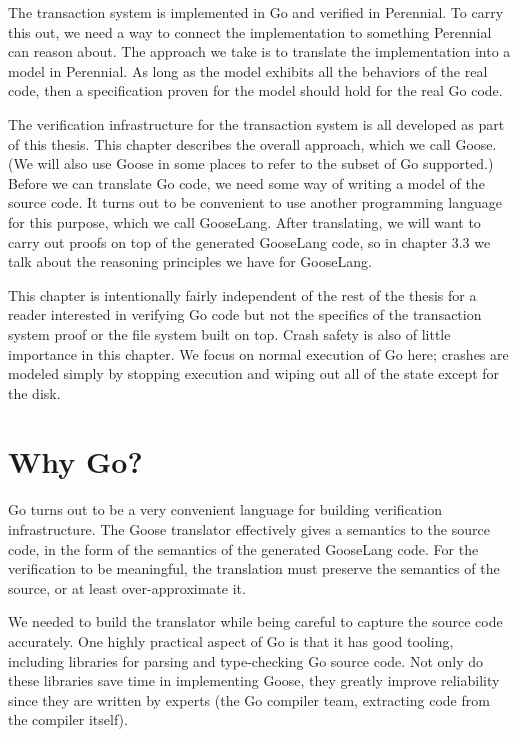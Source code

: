 The transaction system is implemented in Go and verified in Perennial.
To carry this out, we need a way to connect the implementation to
something Perennial can reason about. The approach we take is to
translate the implementation into a model in Perennial. As long as the
model exhibits all the behaviors of the real code, then a specification
proven for the model should hold for the real Go code.

The verification infrastructure for the transaction system is all
developed as part of this thesis. This chapter describes the overall
approach, which we call Goose. (We will also use Goose in some places to
refer to the subset of Go supported.) Before we can translate Go code, we need
some way of writing a model of the source code. It turns out to be
convenient to use another programming language for this purpose, which
we call GooseLang. After translating, we will want to carry out proofs
on top of the generated GooseLang code, so in chapter 3.3 we talk about
the reasoning principles we have for GooseLang.

This chapter is intentionally fairly independent of the rest of the
thesis for a reader interested in verifying Go code but not the
specifics of the transaction system proof or the file system built on
top. Crash safety is also of little importance in this chapter. We focus
on normal execution of Go here; crashes are modeled simply by stopping
execution and wiping out all of the state except for the disk.

\section{Why Go?}

Go turns out to be a very convenient language for building verification
infrastructure. The Goose translator effectively gives a semantics to
the source code, in the form of the semantics of the generated GooseLang
code. For the verification to be meaningful, the translation must
preserve the semantics of the source, or at least over-approximate it.

We needed to build the translator while being careful to capture the
source code accurately. One highly practical aspect of Go is that it has
good tooling, including libraries for parsing and type-checking Go
source code. Not only do these libraries save time in implementing
Goose, they greatly improve reliability since they are written by
experts (the Go compiler team, extracting code from the compiler
itself).

